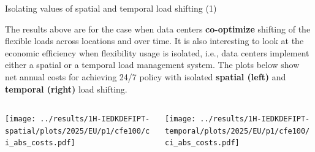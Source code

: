 \begin{frame}{Isolating values of spatial and temporal load shifting (1)}

  {\footnotesize
  The results above are for the case when data centers {\bf co-optimize} shifting of the flexible loads across locations and over time. It is also interesting to look at the economic efficiency when flexibility usage is isolated, i.e., data centers implement either a spatial or a temporal load management system. The plots below show net annual costs for achieving 24/7 policy with isolated {\bf spatial (left)} and {\bf temporal (right)} load shifting.

  \vspace{0.4cm} 
  \begin{columns}
    \begin{column}{7cm}
    \texttt{[image: ../results/1H-IEDKDEFIPT-spatial/plots/2025/EU/p1/cfe100/ci\_abs\_costs.pdf]}
    \end{column}
    
    \begin{column}{7cm}
    \texttt{[image: ../results/1H-IEDKDEFIPT-temporal/plots/2025/EU/p1/cfe100/ci\_abs\_costs.pdf]}
    \end{column}
  \end{columns}

  }
  
\end{frame}


